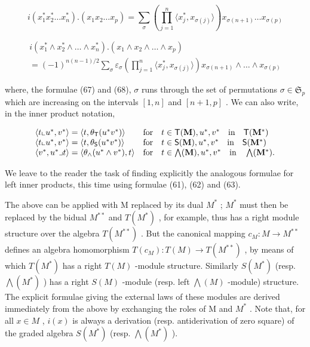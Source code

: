 \[
i \left(x _ {1} ^ {*} x _ {2} ^ {*} \dots x _ {n} ^ {*}\right). (x _ {1} x _ {2} \dots x _ {p}) = \sum_ {\sigma} \left(\prod_ {j = 1} ^ {n} \langle x _ {j} ^ {*}, x _ {\sigma (j)} \rangle\right) x _ {\sigma (n + 1)} \dots x _ {\sigma (p)}\tag{67}
\]

\[
\begin{array}{l} i \left(x _ {1} ^ {*} \wedge x _ {2} ^ {*} \wedge \dots \wedge x _ {n} ^ {*}\right). \left(x _ {1} \wedge x _ {2} \wedge \dots \wedge x _ {p}\right) \\ = (- 1) ^ {n (n - 1) / 2} \sum_ {\sigma} \varepsilon_ {\sigma} \left(\prod_ {j = 1} ^ {n} \langle x _ {j} ^ {*}, x _ {\sigma (j)} \rangle\right) x _ {\sigma (n + 1)} \wedge \dots \wedge x _ {\sigma (p)} \end{array}\tag{68}
\]

where, the formulae (67) and (68), \(\sigma\) runs through the set of permutations \(\sigma \in \mathfrak{S}_p\) which are increasing on the intervals \([1, n]\) and \([n + 1, p]\) . We can also write, in the inner product notation,

\[
\begin{array}{l l} \langle t \llcorner u ^ {*}, v ^ {*} \rangle = \langle t, \theta_ {\mathsf {T}} (u ^ {*} v ^ {*}) \rangle & \text {for} \quad t \in \mathsf {T} (\mathbf {M}), u ^ {*}, v ^ {*} \quad \text {in} \quad \mathsf {T} (\mathbf {M} ^ {*}) \\ \langle t \llcorner u ^ {*}, v ^ {*} \rangle = \langle t, \theta_ {\mathsf {S}} (u ^ {*} v ^ {*}) \rangle & \text {for} \quad t \in \mathsf {S} (\mathbf {M}), u ^ {*}, v ^ {*} \quad \text {in} \quad \mathsf {S} (\mathbf {M} ^ {*}) \\ \langle v ^ {*}, u ^ {*} \lrcorner t \rangle = \langle \theta_ {\wedge} (u ^ {*} \wedge v ^ {*}), t \rangle & \text {for} \quad t \in \bigwedge (\mathbf {M}), u ^ {*}, v ^ {*} \quad \text {in} \quad \bigwedge (\mathbf {M} ^ {*}). \end{array}
\]

We leave to the reader the task of finding explicitly the analogous formulae for left inner products, this time using formulae (61), (62) and (63).

The above can be applied with M replaced by its dual \(M^{*}\) ; \(M^{*}\) must then be replaced by the bidual \(M^{**}\) and \(T(M^{*})\) , for example, thus has a right module structure over the algebra \(T(M^{**})\) . But the canonical mapping \(c_{M}: M \to M^{**}\) defines an algebra homomorphism \(T(c_{M}): T(M) \to T(M^{**})\) , by means of which \(T(M^{*})\) has a right \(T(M)\) -module structure. Similarly \(S(M^{*})\) (resp. \(\bigwedge(M^{*})\) ) has a right \(S(M)\) -module (resp. left \(\bigwedge(M)\) -module) structure. The explicit formulae giving the external laws of these modules are derived immediately from the above by exchanging the roles of M and \(M^{*}\) . Note that, for all \(x \in M\) , \(i(x)\) is always a derivation (resp. antiderivation of zero square) of the graded algebra \(S(M^{*})\) (resp. \(\bigwedge(M^{*})\) ).

